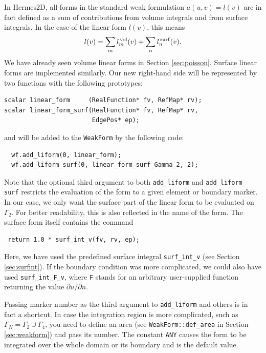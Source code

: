 In Hermes2D, all forms in the standard weak formulation $a(u,v) = l(v)$
are in fact defined as a sum of contributions from volume integrals and from
surface integrals. In the case of the linear form $l(v)$, this means
$$l(v) = \sum_m l_m^{\,\rm vol}(v) + \sum_n l_n^{\,\rm surf}(v).$$
We have already seen volume linear forms in Section \ref{sec:poisson}.
Surface linear forms are implemented similarly. Our new right-hand side will
be represented by two functions with the following prototypes:

\begin{lstlisting}
scalar linear_form     (RealFunction* fv, RefMap* rv);
scalar linear_form_surf(RealFunction* fv, RefMap* rv,
                        EdgePos* ep);
\end{lstlisting}

and will be added to the {\tt WeakForm} by the following code:

\begin{lstlisting}
  wf.add_liform(0, linear_form);
  wf.add_liform_surf(0, linear_form_surf_Gamma_2, 2);
\end{lstlisting}

Note that the optional third argument to both {\tt add\_liform} and {\tt add\_liform\_ surf}
restricts the evaluation of the form to a given element or boundary marker. In our
case, we only want the surface part of the linear form to be evaluated on $\Gamma_2$.
For better readability, this is also reflected in the name of the form. The surface
form itself contains the command

\begin{lstlisting}
 return 1.0 * surf_int_v(fv, rv, ep);
\end{lstlisting}

Here, we have used the predefined surface integral \verb"surf_int_v" (see Section
\ref{sec:surfint}). If the boundary condition was more complicated, we could also
have used \verb"surf_int_F_v", where {\tt F} stands for an arbitrary user-supplied
function returning the value $\partial u/\partial n$.

Passing marker number as the third argument to {\tt add\_liform} and others is
in fact a shortcut. In case the integration region is more complicated, such as
$\Gamma_N = \Gamma_2 \cup \Gamma_4$, you need to define an area
(see {\tt WeakForm::def\_area} in Section \ref{sec:weakform}) and pass its number.
The constant {\tt ANY} causes the form to be integrated over the whole domain
or its boundary and is the default value.

